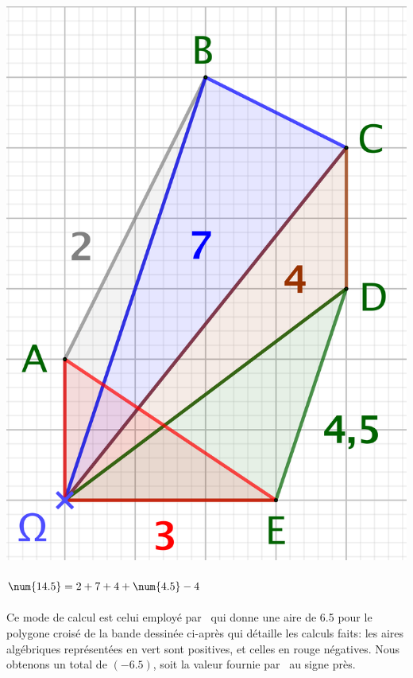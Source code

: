 \begin{multicols}{2}
    \begin{center}
        \includegraphics[scale=.4]{content/polygon/sufficient-cond/convex-2.png}
        
       	\smallskip
	
		$\num{14.5} = 2 + 7 + 4 + \num{4.5} - 4 \vphantom{\dfrac22}$
    \end{center}
\end{multicols}


Ce mode de calcul est celui employé par \geogebra\ qui donne une aire de \num{6.5} pour le polygone croisé de la bande dessinée ci-après qui détaille les calculs faits: les aires algébriques représentées en vert sont positives, et celles en rouge négatives.
Nous obtenons un total de $( - \num{6.5})$, soit la valeur fournie par \geogebra\ au signe près.

\newpage

